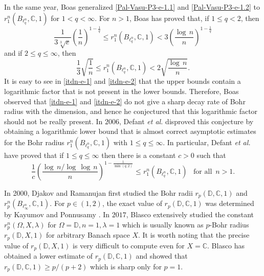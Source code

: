 \documentclass[a4paper,12pt]{amsart}
\theoremstyle{definition}
\newcounter {own}
\begin{document}
 In the same year, Boas \cite{boas-2000} generalized \eqref{Pal-Vasu-P3-e-1.1} and \eqref{Pal-Vasu-P3-e-1.2} to $r^n_1(B_{\ell^n _q},\mathbb{C},1)$ for $1 <q<\infty$. For $n>1$, Boas \cite{boas-2000} has proved that, if $1\leq q <2$, then 
\begin{equation} \label{itdn-e-1}
	\frac{1}{3\sqrt[3]{e}}\left(\frac{1}{n}\right)^{1-\frac{1}{q}} \leq r^n_1(B_{\ell^n _q},\mathbb{C},1) < 3 \left(\frac{\log \, n}{n}\right)^{1-\frac{1}{q}}
\end{equation}
and if $2 \leq q \leq \infty$, then
\begin{equation} \label{itdn-e-2}
	\frac{1}{3} \sqrt{\frac{1}{n}} \leq r^n_1(B_{\ell^n _q},\mathbb{C},1) < 2 \sqrt{\frac{\log\,n}{n}}.
\end{equation}
It is easy to see in \eqref{itdn-e-1} and \eqref{itdn-e-2} that the upper bounds contain a logarithmic factor that is not present in the lower bounds. Therefore, Boas observed that \eqref{itdn-e-1} and \eqref{itdn-e-2} do not give a sharp decay rate of Bohr radius with the dimension, and hence he conjectured that this logarithmic factor should not be really present. In $2006$, Defant {\it et al.} \cite{defant-2006} disproved this conjecture by obtaining a logarithmic lower bound that is almost correct asymptotic estimates for the Bohr radius $r^n_1(B_{\ell^n _q},\mathbb{C},1)$ with $1\leq q \leq \infty$. In particular, Defant {\it et al.} have proved that if $1\leq q \leq \infty$ then there is a constant $c>0$ such that
 \begin{equation} \label{itdn-e-3}    
 	\frac{1}{c} \left(\frac{\log\,n/\log\, \log\,n}{n}\right)^{1-\frac{1}{\min(q,2)}} \leq r^n_1(B_{\ell^n _q},\mathbb{C},1) \,\,\,\,\, \mbox{for all} \,\,\, n>1.
\end{equation}

In 2000, Djakov and Ramanujan \cite{Djakov & Ramanujan & J. Anal & 2000} first studied the Bohr radii $r_p(\mathbb{D}, \mathbb{C},1)$ and\\ $r^n_p(B_{\ell^n_{\infty}},\mathbb{C},1)$. For $p\in (1,2)$, the exact value of $r_p(\mathbb{D}, \mathbb{C},1)$ was determined by Kayumov and Ponnusamy \cite{Kay & Pon & AASFM & 2019}. In $2017$, Blasco \cite{Blasco-Collect-2017} extensively studied the constant $r^n_p(\Omega,X,\lambda)$ for $\Omega=\mathbb{D}, n=1, \lambda=1$ which is usually known as $p$-Bohr radius $r_p(\mathbb{D},X,1)$ for arbitrary Banach space $X$. It is worth noting that the precise value of $r_p(\mathbb{D},X,1)$ is very difficult to compute even for $X=\mathbb{C}$. Blasco \cite{Blasco-Collect-2017} has obtained a lower estimate of $r_p(\mathbb{D},\mathbb{C},1)$ and showed that $r_p(\mathbb{D},\mathbb{C},1) \geq p/(p+2)$ which is sharp only for $p=1$. 
\vspace{2mm}
\end{document}

